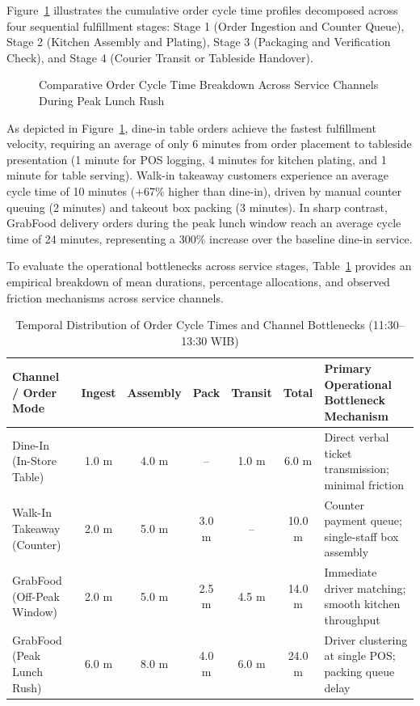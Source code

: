 \documentclass{jomas}
\begin{document}
Figure~\ref{fig:order-cycle-time} illustrates the cumulative order cycle time profiles decomposed across four sequential fulfillment stages: Stage 1 (Order Ingestion and Counter Queue), Stage 2 (Kitchen Assembly and Plating), Stage 3 (Packaging and Verification Check), and Stage 4 (Courier Transit or Tableside Handover).

\begin{figure}[t]
\centering

\caption{Comparative Order Cycle Time Breakdown Across Service Channels During Peak Lunch Rush}
\label{fig:order-cycle-time}
\end{figure}

As depicted in Figure~\ref{fig:order-cycle-time}, dine-in table orders achieve the fastest fulfillment velocity, requiring an average of only 6 minutes from order placement to tableside presentation (1 minute for POS logging, 4 minutes for kitchen plating, and 1 minute for table serving). Walk-in takeaway customers experience an average cycle time of 10 minutes (+67\% higher than dine-in), driven by manual counter queuing (2 minutes) and takeout box packing (3 minutes). In sharp contrast, GrabFood delivery orders during the peak lunch window reach an average cycle time of 24 minutes, representing a 300\% increase over the baseline dine-in service.

To evaluate the operational bottlenecks across service stages, Table~\ref{tab:order-cycle-times} provides an empirical breakdown of mean durations, percentage allocations, and observed friction mechanisms across service channels.

\begin{table}[H]
\caption{Temporal Distribution of Order Cycle Times and Channel Bottlenecks (11:30--13:30 WIB)}
\label{tab:order-cycle-times}
\centering
\small
\setlength{\tabcolsep}{4.5pt}
\begin{tabularx}{\textwidth}{l c c c c c X}
\toprule
\textbf{Channel / Order Mode} & \textbf{Ingest} & \textbf{Assembly} & \textbf{Pack} & \textbf{Transit} & \textbf{Total} & \textbf{Primary Operational Bottleneck Mechanism} \\
\midrule
Dine-In (In-Store Table) & 1.0 m & 4.0 m & -- & 1.0 m & 6.0 m & Direct verbal ticket transmission; minimal friction \\
Walk-In Takeaway (Counter) & 2.0 m & 5.0 m & 3.0 m & -- & 10.0 m & Counter payment queue; single-staff box assembly \\
GrabFood (Off-Peak Window) & 2.0 m & 5.0 m & 2.5 m & 4.5 m & 14.0 m & Immediate driver matching; smooth kitchen throughput \\
GrabFood (Peak Lunch Rush) & 6.0 m & 8.0 m & 4.0 m & 6.0 m & 24.0 m & Driver clustering at single POS; packing queue delay \\
\bottomrule
\end{tabularx}
\end{table}
\end{document}
